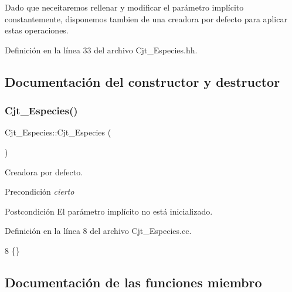 Dado que neceitaremos rellenar y modificar el parámetro implícito constantemente, disponemos tambien de una creadora por defecto para aplicar estas operaciones. 

Definición en la línea 33 del archivo Cjt\+\_\+\+Especies.\+hh.



\subsection{Documentación del constructor y destructor}
\mbox{\label{class_cjt___especies_ae423b9d5a456158136c17d9210c90c2e}} 
\subsubsection{\texorpdfstring{Cjt\+\_\+\+Especies()}{Cjt\_Especies()}}
{\footnotesize\ttfamily Cjt\+\_\+\+Especies\+::\+Cjt\+\_\+\+Especies (\begin{DoxyParamCaption}{ }\end{DoxyParamCaption})}



Creadora por defecto. 

\begin{DoxyPrecond}{Precondición}
{\itshape cierto} 
\end{DoxyPrecond}
\begin{DoxyPostcond}{Postcondición}
El parámetro implícito no está inicializado. 
\end{DoxyPostcond}


Definición en la línea 8 del archivo Cjt\+\_\+\+Especies.\+cc.


\begin{DoxyCode}
8 \{\}
\end{DoxyCode}


\subsection{Documentación de las funciones miembro}
\mbox{\label{class_cjt___especies_aefad42bebc96b7bc924053630b365fbd}} 
